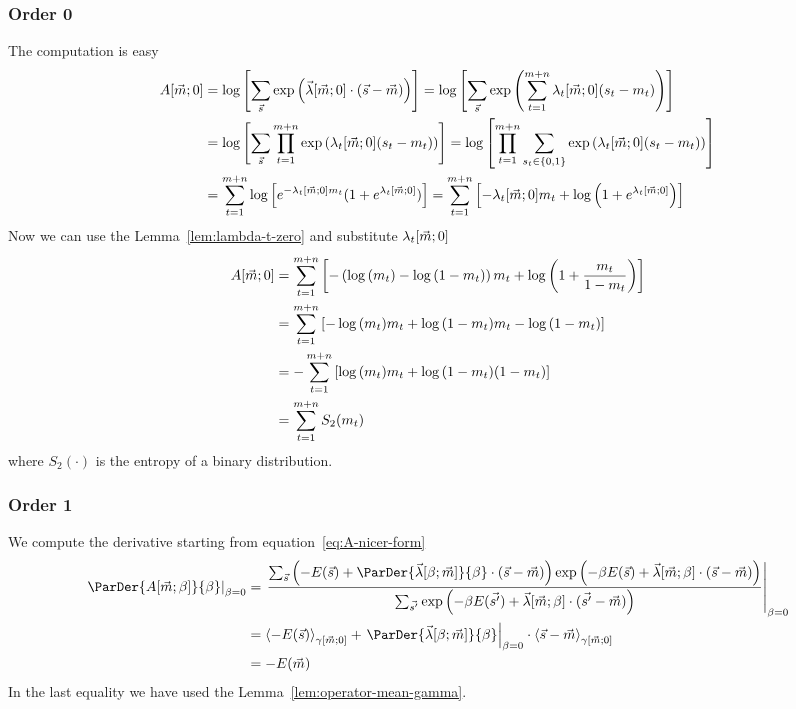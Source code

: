 \subsubsection{Order 0}
The computation is easy
\begin{align*}
  A{\left[\vec{m};0\right]}
  &= \log{\left[\sum_{\vec{s}}\exp{\left(\vec{\lambda}{\left[\vec{m};0\right]}\cdot(\vec{s}-\vec{m})\right)}\right]}
   = \log{\left[\sum_{\vec{s}}\exp{\left(\sum_{t=1}^{m+n}\lambda_t{\left[\vec{m};0\right]}(s_t-m_t)\right)}\right]}\\
  &= \log{\left[\sum_{\vec{s}}\prod_{t=1}^{m+n}\exp{\left(\lambda_t{\left[\vec{m};0\right]}(s_t-m_t)\right)}\right]}
   = \log{\left[\prod_{t=1}^{m+n}\sum_{s_t \in \{0,1\}}\exp{\left(\lambda_t{\left[\vec{m};0\right]}(s_t-m_t)\right)}\right]}\\
  &= \sum_{t=1}^{m+n}\log{\left[e^{-\lambda_t{\left[\vec{m};0\right]}m_t}(1+e^{\lambda_t{\left[\vec{m};0\right]}})\right]}
   = \sum_{t=1}^{m+n}\left[-\lambda_t{\left[\vec{m};0\right]} m_t + \log{\left(1+e^{\lambda_t{\left[\vec{m};0\right]}}\right)}\right]
\end{align*}
Now we can use the Lemma~\ref{lem:lambda-t-zero} and substitute \(\lambda_t{\left[\vec{m};0\right]}\)
\begin{align*}
  A{\left[\vec{m};0\right]}
  &= \sum_{t=1}^{m+n}\left[-\left(\log{\left(m_t\right)} - \log{\left(1-m_t\right)}\right) m_t
                + \log{\left(1+\frac{m_t}{1-m_t}\right)}\right] \\
  &= \sum_{t=1}^{m+n}\left[-\log{\left(m_t\right)}m_t + \log{\left(1-m_t\right)}m_t
                - \log{\left(1-m_t\right)}\right] \\
  &= -\sum_{t=1}^{m+n}\left[\log{\left(m_t\right)}m_t + \log{\left(1-m_t\right)}(1-m_t)\right] \\
  &= \sum_{t=1}^{m+n} S_2{(m_t)}
\end{align*}
where \(S_2{(\cdot)}\) is the entropy of a binary distribution.

\subsubsection{Order 1} \label{subsec:order-1-A}
We compute the derivative starting from equation~\eqref{eq:A-nicer-form}
\begin{align*}
  \left.\ParDer{A{\left[\vec{m};\beta\right]}}{\beta}\right|_{\beta=0}
  &= \left.
    \frac{
      \sums\left(-E{(\vec{s})}+\ParDer{\Lambd{\beta}{\vec{m}}}{\beta}\cdot(\vec{s}-\vec{m})\right)\GammaExp{}
    }{
      \sum_{\vec{s'}}\GammaExp{'}
    }\right|_{\beta=0}\\
  &= \Gmean{-E{(\vec{s})}}{\vec{m}}{0} +
     \left.\ParDer{\Lambd{\beta}{\vec{m}}}{\beta}\right|_{\beta=0}\cdot\Gmean{\vec{s}-\vec{m}}{\vec{m}}{0}\\
  &= -E{(\vec{m})}
\end{align*}
In the last equality we have used the Lemma~\ref{lem:operator-mean-gamma}.

